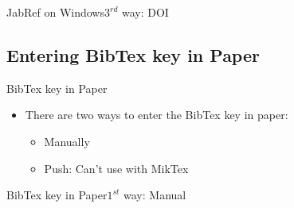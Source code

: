 \documentclass [9pt] {beamer}
\begin{document}
\begin{frame}{JabRef on Windows}{$3^{rd}$ way: DOI}

\begin{figure}
\caption{}
\end{figure}

\end{frame}


\subsection{Entering BibTex key in Paper}
\begin{frame}{BibTex key in Paper}%
\begin{itemize}
\item There are two ways to enter the BibTex key in paper:
\begin{itemize}
\item Manually
\item Push: Can't use with MikTex
\end{itemize}
\end{itemize}

\end{frame}

\begin{frame}{BibTex key in Paper}{$1^{st}$ way: Manual}

\begin{figure}
\end{figure}

\end{frame}
\end{document}
